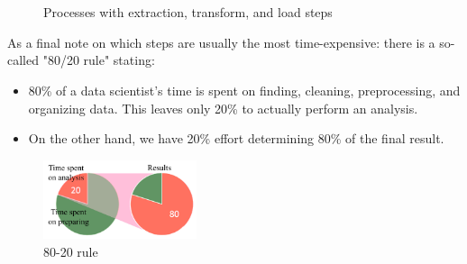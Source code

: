 \begin{figure}[H]
  \centering

  \\\hspace*{0.5cm}\\

  \caption{Processes with extraction, transform, and load steps}
  \label{fig:1_etl_and_elt}
\end{figure}

As a final note on which steps are usually the most time-expensive: there is a so-called "80/20 rule" stating:
\begin{itemize}
  \item 80\% of a data scientist's time is spent on finding, cleaning, preprocessing, and organizing data. This leaves only 20\% to actually perform an analysis.
  \item On the other hand, we have 20\% effort determining 80\% of the final result.
\end{itemize}

\begin{figure}[H]
  \centering
  \includegraphics[width=0.4\textwidth]{assets/basics/80_20.png}
  \caption{80-20 rule}
  \label{fig:1_80_20}
\end{figure}